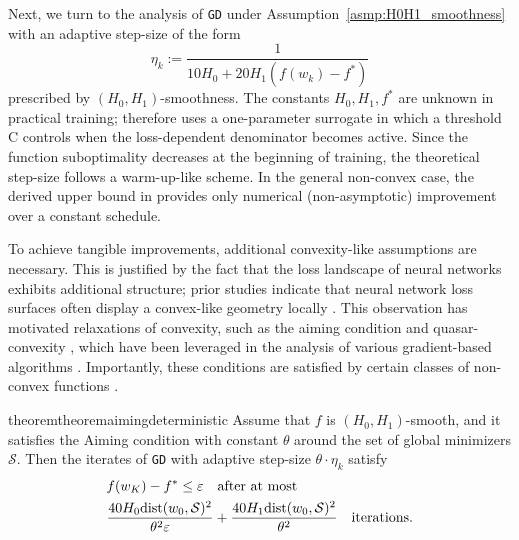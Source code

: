 \documentclass[a4paper,11pt]{article}
\newcommand{\algname}[1]{\texttt{#1}}
\newcommand{\cS}{\mathcal{S}}
\newcommand{\1}{\mathbbm{1}}
\theoremstyle{plain}
\newtheorem{theorem}{Theorem}[section]
\begin{document}
Next, we turn to the analysis of \algname{GD} under Assumption~\ref{asmp:H0H1_smoothness} with an adaptive step-size of the form
\begin{equation}
\label{eq:adaptive_stepsize}
   \eta_k := \frac{1}{10H_0 + 20H_1(f(w_k)-f^*)} 
\end{equation}
 prescribed by $(H_0, H_1)$-smoothness. The constants $H_0, H_1, f^*$ are unknown in practical training;  therefore uses a one-parameter surrogate in which a threshold C controls when the loss-dependent denominator becomes active. Since the function suboptimality decreases at the beginning of training, the theoretical step-size follows a warm-up-like scheme. In the general non-convex case, the derived upper bound in  provides only numerical (non-asymptotic) improvement over a constant schedule.


To achieve tangible improvements, additional convexity-like assumptions are necessary. This is justified by the fact that the loss landscape of neural networks exhibits additional structure; prior studies indicate that neural network loss surfaces often display a convex-like geometry locally \citep{kleinberg2018alternative, guille2023no, islamov2024loss, tran2024empirical}. This observation has motivated relaxations of convexity, such as the aiming condition \citep{liu2023aiming} and quasar-convexity \citep{hardt2018gradient}, which have been leveraged in the analysis of various gradient-based algorithms \citep{gower2021sgd, hinder2020near, fu2023accelerated}. Importantly, these conditions are satisfied by certain classes of non-convex functions \citep{hardt2018gradient, liu2023aiming}.

\begin{restatable}{theorem}{theoremaimingdeterministic}\label{th:aiming_deterministic_adaptive_step-size}
    Assume that $f$ is $(H_0,H_1)$-smooth, and it satisfies the Aiming condition with constant $\theta$ around the set of global minimizers $\cS$. Then the iterates of \algname{GD} with adaptive step-size $\theta \cdot \eta_k$ 
    satisfy  
    \begin{align*}
    & f(w_K) - f^* \le \varepsilon \quad \text{after at most} \\ &\frac{40H_0{\rm dist}(w_0,\cS)^2}{\theta^2\varepsilon} + \frac{40H_1{\rm dist}(w_0,\cS)^2}{\theta^2} \quad \text{iterations.}
    \end{align*}
     
\end{restatable}
\end{document}
